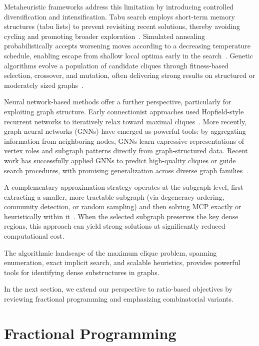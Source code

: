 Metaheuristic frameworks address this limitation by introducing
controlled diversification and intensification. Tabu search employs
short-term memory structures (tabu lists) to prevent revisiting recent
solutions, thereby avoiding cycling and promoting broader
exploration~\citep{FridenA89, gendreau1993solving, Battiti99,
soriano1996}. Simulated annealing probabilistically accepts worsening
moves according to a decreasing temperature schedule, enabling escape
from shallow local optima early in the
search~\citep{AartsKorst89, jerrum92, homer94}. Genetic algorithms
evolve a population of candidate cliques through fitness-based
selection, crossover, and mutation, often delivering strong results on
structured or moderately sized
graphs~\citep{back1994, carter1993, foster1995, Guturu1994CliqueFG,
marchiori98}.

Neural network-based methods offer a further perspective, particularly
for exploiting graph structure. Early connectionist approaches used
Hopfield-style recurrent networks to iteratively relax toward maximal
cliques~\citep{ramanujam1988, Jagota95, jagota1992, AartsKorst89,
bertoni1997, FUNABIKI1992340, shrivastava1990, wu1994NewMT}. More
recently, graph neural networks (GNNs) have emerged as powerful tools:
by aggregating information from neighboring nodes, GNNs learn
expressive representations of vertex roles and subgraph patterns
directly from graph-structured data. Recent work has successfully
applied GNNs to predict high-quality cliques or guide search
procedures, with promising generalization across diverse graph
families~\citep{Karalias2020, min2022}.

A complementary approximation strategy operates at the subgraph level,
first extracting a smaller, more tractable subgraph (via degeneracy
ordering, community detection, or random sampling) and then solving
MCP exactly or heuristically within it~\citep{xue1994}. When the
selected subgraph preserves the key dense regions, this approach can
yield strong solutions at significantly reduced computational cost.

The algorithmic landscape of the maximum clique problem, spanning
enumeration, exact implicit search, and scalable heuristics, provides
powerful tools for identifying dense substructures in graphs. 

In the next section, we extend our perspective to ratio-based objectives by reviewing fractional programming and emphasizing combinatorial variants.

\section{Fractional Programming}\label{sec.fp}

